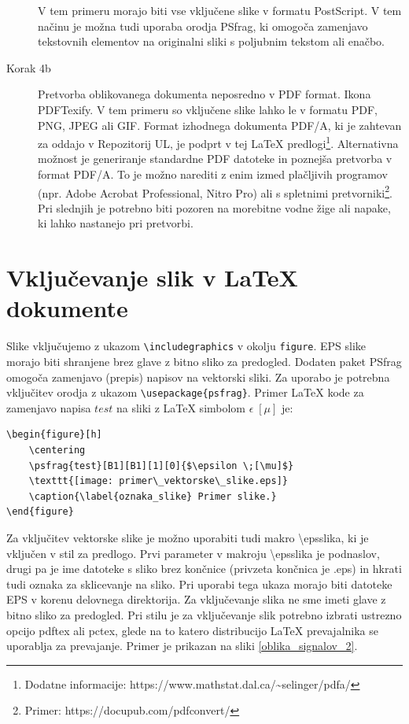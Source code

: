 \documentclass[a4paper,twoside,openright,12pt,slovene]{book}
\begin{document}
\begin{description}
\begin{itemize}[noitemsep]
    \end{itemize}
    V tem primeru morajo biti vse vključene slike v formatu PostScript. V tem načinu je možna tudi uporaba orodja PSfrag, ki omogoča zamenjavo tekstovnih elementov na originalni sliki s poljubnim tekstom ali enačbo.
    \item[Korak 4b] Pretvorba oblikovanega dokumenta neposredno v PDF format. Ikona PDFTexify. V tem primeru so vključene slike lahko le v formatu PDF, PNG, JPEG ali GIF. Format izhodnega dokumenta PDF/A, ki je zahtevan za oddajo v Repozitorij UL, je podprt v tej LaTeX predlogi\footnote{Dodatne informacije: https://www.mathstat.dal.ca/\textasciitilde selinger/pdfa/}. Alternativna možnost je generiranje standardne PDF datoteke in poznejša pretvorba v format PDF/A. To je možno narediti z enim izmed plačljivih programov (npr. Adobe Acrobat Professional, Nitro Pro) ali s spletnimi pretvorniki\footnote{Primer: https://docupub.com/pdfconvert/}. Pri slednjih je potrebno biti pozoren na morebitne vodne žige ali napake, ki lahko nastanejo pri pretvorbi.
\end{description}

\chapter{Vključevanje slik v LaTeX dokumente} \label{prilogaB}

Slike vključujemo z ukazom \texttt{\textbackslash includegraphics} v okolju \texttt{figure}. EPS slike morajo biti shranjene brez glave z bitno sliko za predogled. Dodaten paket PSfrag omogoča zamenjavo (prepis) napisov na vektorski sliki. Za uporabo je potrebna vključitev orodja z ukazom \texttt{\textbackslash usepackage\{psfrag\}}. Primer LaTeX kode za zamenjavo napisa $test$ na sliki z LaTeX simbolom $\epsilon \;[\mu]$ je:

\begin{footnotesize}
\begin{verbatim}
\begin{figure}[h]
    \centering
    \psfrag{test}[B1][B1][1][0]{$\epsilon \;[\mu]$}
    \texttt{[image: primer\_vektorske\_slike.eps]}
    \caption{\label{oznaka_slike} Primer slike.}
\end{figure}
\end{verbatim}
\end{footnotesize}

Za vključitev vektorske slike je možno uporabiti tudi makro \textbackslash epsslika, ki je vključen v stil za predlogo. Prvi parameter v makroju \textbackslash epsslika je podnaslov, drugi pa je ime datoteke s sliko brez končnice (privzeta končnica je .eps) in hkrati tudi oznaka za sklicevanje na sliko. Pri uporabi tega ukaza morajo biti datoteke EPS v korenu delovnega direktorija. Za vključevanje slika ne sme imeti glave z bitno sliko za predogled. Pri stilu je za vključevanje slik potrebno izbrati ustrezno opcijo pdftex ali pctex, glede na to katero distribucijo LaTeX prevajalnika se uporablja za prevajanje. Primer je prikazan na sliki \ref{oblika_signalov_2}.
\end{document}
